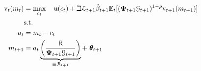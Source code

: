   \begin{equation*}\begin{gathered}\begin{aligned}
        {\mathrm{v}}_{t}({m}_{t})  & = \max_{{c}_{t}}~~~ \mathrm{u}({c}_{t})+\beth\mathcal{L}_{t+1}\hat{\beta}_{t+1}
        {\mathbb{E}}_{t}[(\mathbf{\Psi}_{t+1}\mathcal{G}_{t+1})^{1-{\rho}}{\mathrm{v}}_{t+1}({m}_{t+1})]   \\
        & \text{s.t.}   \nonumber \\
        {a}_{t}    & = {m}_{t}-{c}_{t} \nonumber
        \\      {m}_{t+1}  & = {a}_{t}\underbrace{\left(\frac{{\mathsf{R}}}{\mathbf{\Psi}_{t+1}\mathcal{G}_{t+1}}\right)}_{\equiv \mathcal{R}_{t+1}}+ ~\pmb{\theta}_{t+1}
      \end{aligned}\end{gathered}\end{equation*}
